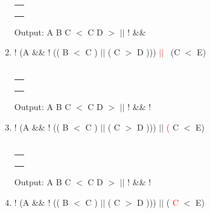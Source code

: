 \documentclass[a4paper]{article}
\begin{document}
\begin{large}
\begin{enumerate}
          \\
          \begin{tabular}[t]{ | p{1.6em} | }
            \makecell{}  \\ \hline
            \makecell{}  \\ \hline
            \makecell{}  \\ \hline
            \makecell{!} \\ \hline
          \end{tabular}
          \hspace{2em}
          Output: A B C $<$ C D $>$ $||$ ! \&\&
    \item
          ! (A \&\& ! (( B $<$ C ) $||$ ( C $>$ D ))) \textcolor{red}{$||$}  \ (C $<$ E) \\
          \\
          \begin{tabular}[t]{ | p{1.6em} | }
            \makecell{}     \\ \hline
            \makecell{}     \\ \hline
            \makecell{}     \\ \hline
            \makecell{$||$} \\ \hline
          \end{tabular}
          \hspace{2em}
          Output: A B C $<$ C D $>$ $||$ ! \&\& !
    \item
          ! (A \&\& ! (( B $<$ C ) $||$ ( C $>$ D ))) $||$ \textcolor{red}{(} C $<$ E) \\
          \\
          \begin{tabular}[t]{ | p{1.6em} | }
            \makecell{}     \\ \hline
            \makecell{}     \\ \hline
            \makecell{(}    \\ \hline
            \makecell{$||$} \\ \hline
          \end{tabular}
          \hspace{2em}
          Output: A B C $<$ C D $>$ $||$ ! \&\& !
    \item
          ! (A \&\& ! (( B $<$ C ) $||$ ( C $>$ D ))) $||$ ( \textcolor{red}{C}  $<$ E) \\
          \\
          \begin{tabular}[t]{ | p{1.6em} | }
            \makecell{}     \\ \hline

\end{tabular}
\end{enumerate}
\end{large}
\end{document}
